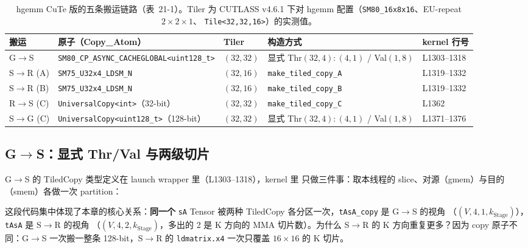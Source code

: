 \begin{table}[htbp]
\centering
\footnotesize
\begin{tabular}{@{}lllll@{}}
  \toprule
  搬运 & 原子（Copy\_Atom） & Tiler & 构造方式 & kernel 行号 \\
  \midrule
  G$\to$S & \texttt{SM80\_\allowbreak{}CP\_\allowbreak{}ASYNC\_\allowbreak{}CACHEGLOBAL\allowbreak{}<uint128\_\allowbreak{}t>} & $(32,32)$
    & 显式 Thr$(32,4){:}(4,1)$ / Val$(1,8)$ & L1303--1318 \\
  S$\to$R (A) & \texttt{SM75\_\allowbreak{}U32x4\_\allowbreak{}LDSM\_\allowbreak{}N} & $(32,16)$
    & \texttt{make\_\allowbreak{}tiled\_\allowbreak{}copy\_\allowbreak{}A} & L1319--1332 \\
  S$\to$R (B) & \texttt{SM75\_\allowbreak{}U32x4\_\allowbreak{}LDSM\_\allowbreak{}N} & $(32,16)$
    & \texttt{make\_\allowbreak{}tiled\_\allowbreak{}copy\_\allowbreak{}B} & L1319--1332 \\
  R$\to$S (C) & \texttt{Universal\allowbreak{}Copy\allowbreak{}<int>}（32-bit） & $(32,32)$
    & \texttt{make\_\allowbreak{}tiled\_\allowbreak{}copy\_\allowbreak{}C} & L1362 \\
  S$\to$G (C) & \texttt{Universal\allowbreak{}Copy\allowbreak{}<uint128\_\allowbreak{}t>}（128-bit） & $(32,32)$
    & 显式 Thr$(32,4){:}(4,1)$ / Val$(1,8)$ & L1371--1376 \\
  \bottomrule
\end{tabular}
\caption{hgemm CuTe 版的五条搬运链路（表~21-1）。Tiler 为 CUTLASS v4.6.1
下对 hgemm 配置（\texttt{SM80\_\allowbreak{}16x8x16}、EU-repeat $2\times2\times1$、
\texttt{Tile\allowbreak{}<32,\allowbreak{}32,\allowbreak{}16>}）的实测值。}\label{tab:21-1}
\end{table}

\subsection{G$\to$S：显式 Thr/Val 与两级切片}

G$\to$S 的 TiledCopy 类型定义在 launch wrapper 里（L1303--1318），kernel 里
只做三件事：取本线程的 slice、对源（gmem）与目的（smem）各做一次 partition：



这段代码集中体现了本章的核心关系：\textbf{同一个} \texttt{sA} Tensor 被两种
TiledCopy 各分区一次，\texttt{tAsA\_copy} 是 G$\to$S 的视角
（$(V,4,1,k_{\mathrm{Stage}})$），\texttt{tAsA} 是 S$\to$R 的视角
（$(V,4,2,k_{\mathrm{Stage}})$，多出的 2 是 K 方向的 MMA 切片数）。为什么
S$\to$R 的 K 方向重复更多？因为 copy 原子不同：G$\to$S 一次搬一整条
128-bit，S$\to$R 的 \texttt{ldmatrix.x4} 一次只覆盖 $16\times16$ 的 K 切片。

